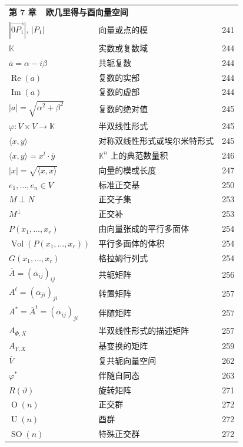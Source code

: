 \begin{longtable}{@{}l l r}
\multicolumn{3}{l}{\textbf{第 7 章\ \ 欧几里得与酉向量空间}} \\[2pt]
$|\overrightarrow{0P_1}|$, $|P_1|$ & 向量或点的模 & 241 \\
$\mathbb{K}$ & 实数或复数域 & 244 \\
$\overline{a} = \alpha - i\beta$ & 共轭复数 & 244 \\
$\operatorname{Re}(a)$ & 复数的实部 & 244 \\
$\operatorname{Im}(a)$ & 复数的虚部 & 244 \\
$|a| = \sqrt{\alpha^2 + \beta^2}$ & 复数的绝对值 & 245 \\
$\varphi \colon V \times V \longrightarrow \mathbb{K}$ & 半双线性形式 & 245 \\
$\langle x, y \rangle$ & 对称双线性形式或埃尔米特形式 & 245 \\
$\langle x, y \rangle = x^t \cdot \overline{y}$ & $\mathbb{K}^n$ 上的典范数量积 & 246 \\
$|x| = \sqrt{\langle x, x \rangle}$ & 向量的模或长度 & 247 \\
$e_1, \ldots, e_n \in V$ & 标准正交基 & 250 \\
$M \perp N$ & 正交子集 & 253 \\
$M^\perp$ & 正交补 & 253 \\
$P(x_1, \ldots, x_r)$ & 由向量张成的平行多面体 & 254 \\
$\operatorname{Vol}(P(x_1, \ldots, x_r))$ & 平行多面体的体积 & 254 \\
$G(x_1, \ldots, x_r)$ & 格拉姆行列式 & 254 \\
$\overline{A} = (\overline{\alpha}_{ij})_{ij}$ & 共轭矩阵 & 256 \\
$A^t = (\alpha_{ji})_{ji}$ & 转置矩阵 & 257 \\
$A^* = \overline{A}^t = (\overline{\alpha}_{ij})_{ji}$ & 伴随矩阵 & 257 \\
$A_{\Phi,X}$ & 半双线性形式的描述矩阵 & 257 \\
$A_{Y,X}$ & 基变换的矩阵 & 259 \\
$\overline{V}$ & 复共轭向量空间 & 262 \\
$\varphi^*$ & 伴随自同态 & 263 \\
$R(\vartheta)$ & 旋转矩阵 & 271 \\
$\operatorname{O}(n)$ & 正交群 & 272 \\
$\operatorname{U}(n)$ & 酉群 & 272 \\
$\operatorname{SO}(n)$ & 特殊正交群 & 272 \\
\end{longtable}


